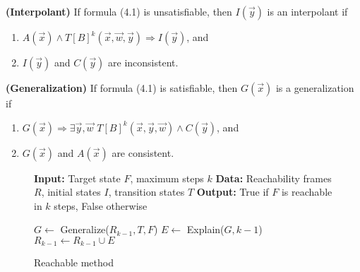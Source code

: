 \vspace{\baselineskip}
\begin{definition}{\textbf{(Interpolant)}}
    \cite{7886665} If formula (4.1) is unsatisfiable, then $I(\vec{y})$ is an interpolant if
    \label{interpolation}
    \begin{enumerate}
        \item \( A(\vec{x}) \land T[B]^k(\vec{x}, \vec{w}, \vec{y}) \Rightarrow I(\vec{y}) \), and
        \item \( I(\vec{y}) \) and \( C(\vec{y}) \) are inconsistent.
    \end{enumerate}
\end{definition}

\vspace{\baselineskip}
\begin{definition}{\textbf{(Generalization)}}
    \cite{7886665} If formula (4.1) is satisfiable, then $G(\vec{x})$ is a generalization if
    \label{generalization}
    \begin{enumerate}
        \item $G(\vec{x}) \Rightarrow \exists \vec{y}, \vec{w}$  $T[B]^k(\vec{x}, \vec{y}, \vec{w}) \wedge C(\vec{y})$, and
        \item $G(\vec{x})$ and $A(\vec{x})$ are consistent.
    \end{enumerate}
\end{definition}

\renewcommand{\figurename}{Algorithm}
\begin{figure}[h]
    \begin{mdframed}
        \begin{algorithmic}[1]
            \State \textbf{Input:} Target state $F$, maximum steps $k$
            \State \textbf{Data:} Reachability frames $R$, initial states $I$, transition states $T$
            \State \textbf{Output:} True if $F$ is reachable in $k$ steps, False otherwise

                \State {}
            \EndIf

                    \State $G \gets$ Generalize($R_{k-1}, T, F$)
                        \State {}
                    \Else
                        \State $E \gets$ Explain($G, k-1$)
                        \State $R_{k-1} \gets R_{k-1} \cup E$
                    \EndIf
                \Else
                    \State {}
                \EndIf
            \EndWhile

        \end{algorithmic}
    \end{mdframed}
    \caption{Reachable method}\label{alg:1}
\end{figure}

